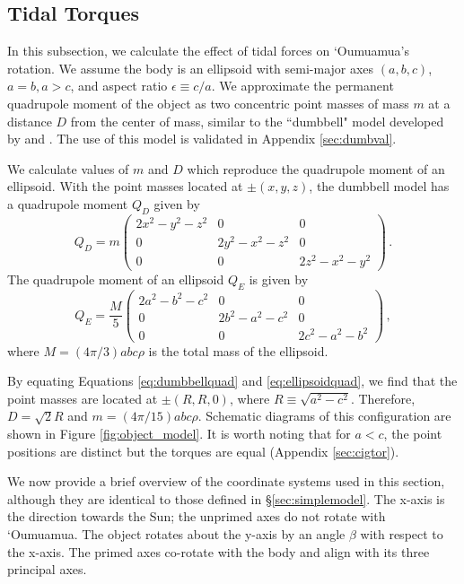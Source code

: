 \documentclass[twocolumn,doublespacing]{aastex631}
\begin{document}
\subsection{Tidal Torques}\label{sec:tidana}

In this subsection, we calculate the effect of tidal forces on `Oumuamua's rotation. We assume the body is an ellipsoid with semi-major axes $(a,b,c)$, $a=b,a>c$, and aspect ratio $\epsilon\equiv c/a$. We approximate the permanent quadrupole moment of the object as two concentric point masses of mass $m$ at a distance $D$ from the center of mass, similar to the ``dumbbell" model developed by \citet{Batygin2015} and \citet{Seligman2021_spin}. The use of this model is validated in Appendix \ref{sec:dumbval}.

We calculate values of $m$ and $D$ which reproduce the quadrupole moment of an ellipsoid. With the point masses located at $\pm(x,y,z)$, the dumbbell model has a quadrupole moment $Q_D$ given by 
\begin{equation}\label{eq:dumbbellquad}
Q_D=m \begin{pmatrix}
2x^2-y^2-z^2 & 0 & 0\\
0 & 2y^2-x^2-z^2 & 0\\
0 & 0 & 2z^2-x^2-y^2
\end{pmatrix}\,.
\end{equation} 
The quadrupole moment of an ellipsoid $Q_E$ is given by
\begin{equation}\label{eq:ellipsoidquad}
Q_E=\frac{M}{5}\begin{pmatrix}
2a^2-b^2-c^2 & 0 & 0\\
0 & 2b^2-a^2-c^2 & 0\\
0 & 0 & 2c^2-a^2-b^2
\end{pmatrix}\,,
\end{equation}
where $M=(4\pi/3)abc\rho$ is the total mass of the ellipsoid. 

By equating Equations \ref{eq:dumbbellquad} and \ref{eq:ellipsoidquad}, we find that the point masses are located at $\pm (R,R,0)$, where $R\equiv\sqrt{a^2-c^2}$. Therefore, $D=\sqrt{2}R$ and $m=(4\pi/15)abc\rho$. Schematic diagrams of this configuration are shown in Figure \ref{fig:object_model}. It is worth noting that for $a<c$, the point positions are distinct but the torques are equal (Appendix \ref{sec:cigtor}). 

We now provide a brief overview of the coordinate systems used in this section, although they are identical to those defined in \S \ref{sec:simplemodel}. The x-axis is the direction towards the Sun; the unprimed axes do not rotate with `Oumuamua. The object rotates about the y-axis by an angle $\beta$ with respect to the x-axis. The primed axes co-rotate with the body and align with its three principal axes. 
\end{document}
